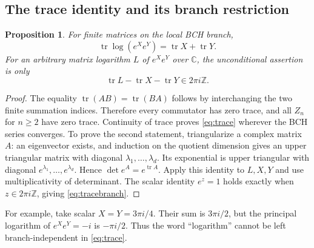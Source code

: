 \documentclass[11pt]{article}
\numberwithin{equation}{section}
\newtheorem{proposition}[proposition]{Proposition}
\theoremstyle{definition}
\theoremstyle{remark}
\DeclareMathOperator{\tr}{tr}
\newcommand{\C}{\mathbb{C}}
\newcommand{\Z}{\mathbb{Z}}
\begin{document}
\subsection{The trace identity and its branch restriction}
\begin{proposition}\label{prop:trace}
For finite matrices on the local BCH branch,
\begin{equation}\label{eq:trace}
 \tr\log(e^Xe^Y)=\tr X+\tr Y.
\end{equation}
For an arbitrary matrix logarithm $L$ of $e^Xe^Y$ over $\C$, the
unconditional assertion is only
\begin{equation}\label{eq:tracebranch}
 \tr L-\tr X-\tr Y\in 2\pi i\Z.
\end{equation}
\end{proposition}
\begin{proof}
The equality $\tr(AB)=\tr(BA)$ follows by interchanging the two finite
summation indices. Therefore every commutator has zero trace, and
all $Z_n$ for $n\geq2$ have zero trace. Continuity of trace proves
\eqref{eq:trace} wherever the BCH series converges.
To prove the second statement, triangularize a complex matrix $A$:
an eigenvector exists, and induction on the quotient dimension gives
an upper triangular matrix with diagonal $\lambda_1,\ldots,\lambda_d$.
Its exponential is upper triangular with diagonal
$e^{\lambda_1},\ldots,e^{\lambda_d}$. Hence
$\det e^A=e^{\tr A}$. Apply this identity to $L,X,Y$ and use
multiplicativity of determinant. The scalar identity $e^z=1$ holds
exactly when $z\in2\pi i\Z$, giving \eqref{eq:tracebranch}.
\end{proof}
For example, take scalar $X=Y=3\pi i/4$. Their sum is $3\pi i/2$,
but the principal logarithm of $e^Xe^Y=-i$ is $-\pi i/2$. Thus the
word ``logarithm'' cannot be left branch-independent in
\eqref{eq:trace}.
\end{document}
